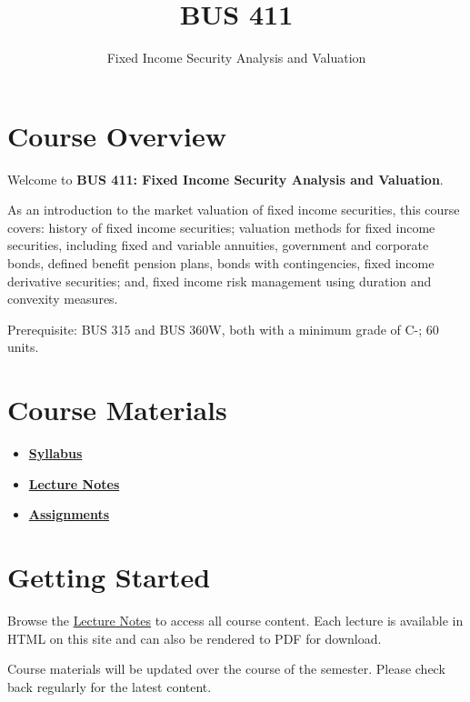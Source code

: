 \documentclass[
  letterpaper,
  DIV=11,
  numbers=noendperiod]{scrartcl}
\title{BUS 411}
\subtitle{Fixed Income Security Analysis and Valuation}
\author{}
\date{}
\providecommand{\tightlist}{%
  \setlength{\itemsep}{0pt}\setlength{\parskip}{0pt}}
\renewcommand*\contentsname{Table of contents}
\newcommand\contentsname{Table of contents}
\begin{document}
\maketitle

\renewcommand*\contentsname{Table of contents}
{
\hypersetup{linkcolor=}
\setcounter{tocdepth}{3}
\tableofcontents
}

\section{Course Overview}\label{course-overview}

Welcome to \textbf{BUS 411: Fixed Income Security Analysis and
Valuation}.

As an introduction to the market valuation of fixed income securities,
this course covers: history of fixed income securities; valuation
methods for fixed income securities, including fixed and variable
annuities, government and corporate bonds, defined benefit pension
plans, bonds with contingencies, fixed income derivative securities;
and, fixed income risk management using duration and convexity measures.

Prerequisite: BUS 315 and BUS 360W, both with a minimum grade of C-; 60
units.

\section{Course Materials}\label{course-materials}

\begin{itemize}
\tightlist
\item
  \textbf{\href{course-outline.md}{Syllabus}}
\item
  \textbf{\href{lecture_notes/index.qmd}{Lecture Notes}}
\item
  \textbf{\href{assignments/assignment1/assignment-1-questions.qmd}{Assignments}}
\end{itemize}

\section{Getting Started}\label{getting-started}

Browse the \href{lecture_notes/index.qmd}{Lecture Notes} to access all
course content. Each lecture is available in HTML on this site and can
also be rendered to PDF for download.

\begin{tcolorbox}[enhanced jigsaw, left=2mm, toptitle=1mm, breakable, title=\textcolor{quarto-callout-note-color}{\faInfo}\hspace{0.5em}{Materials Update}, rightrule=.15mm, colback=white, colframe=quarto-callout-note-color-frame, colbacktitle=quarto-callout-note-color!10!white, leftrule=.75mm, coltitle=black, bottomtitle=1mm, arc=.35mm, titlerule=0mm, bottomrule=.15mm, toprule=.15mm, opacityback=0, opacitybacktitle=0.6]

Course materials will be updated over the course of the semester. Please
check back regularly for the latest content.

\end{tcolorbox}
\end{document}
